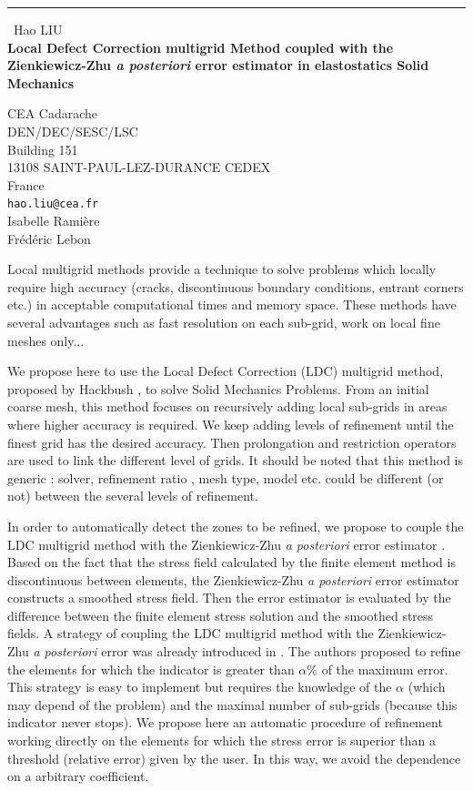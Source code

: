 \documentclass{report}
\begin{document}
\begin{center}
\rule{6in}{1pt} \
{\large Hao LIU \\
{\bf Local Defect Correction multigrid Method coupled with the Zienkiewicz-Zhu \emph{a posteriori} error estimator in elastostatics Solid Mechanics}}

CEA Cadarache \\ DEN/DEC/SESC/LSC \\ Building 151 \\ 13108 SAINT-PAUL-LEZ-DURANCE CEDEX \\ France
\\
{\tt hao.liu@cea.fr}\\
Isabelle Rami{\`e}re\\
Fr{\'e}d{\'e}ric Lebon\end{center}

Local multigrid methods provide a technique to solve problems which
locally require high accuracy (cracks, discontinuous boundary conditions,
entrant corners etc.) in acceptable computational times and memory space.
These methods have several advantages such as fast resolution on each
sub-grid, work on local fine meshes only...

We propose here to use the Local Defect Correction (LDC) multigrid
method, proposed by Hackbush \cite{Hackbusch84}, to solve Solid Mechanics
Problems. From an initial coarse mesh, this method focuses on recursively
adding local sub-grids in areas where higher accuracy is required. We
keep adding levels of refinement until the finest grid has the desired
accuracy. Then prolongation and restriction operators are used to link
the different level of grids. It should be noted that this method is
generic : solver, refinement ratio , mesh type, model etc. could be
different (or not) between the several levels of refinement.

In order to automatically detect the zones to be refined, we propose to
couple the LDC multigrid method with the Zienkiewicz-Zhu \emph{a
posteriori} error estimator \cite{Zienkiewicz87}. Based on the fact that
the stress field calculated by the finite element method is discontinuous
between elements, the Zienkiewicz-Zhu \emph{a posteriori} error estimator
constructs a smoothed stress field. Then the error estimator is evaluated
by the difference between the finite element stress solution and the
smoothed stress fields. A strategy of coupling the LDC multigrid method
with the Zienkiewicz-Zhu \emph{a posteriori} error was already introduced
in \cite{Barbie13CAS,Barbie11}. The authors proposed to refine the
elements for which the indicator is greater than $\alpha$\% of the
maximum error. This strategy is easy to implement but requires the
knowledge of the $\alpha$ (which may depend of the problem) and the
maximal number of sub-grids (because this indicator never stops). We
propose here an automatic procedure of refinement working directly on the
elements for which the stress error is superior than a threshold
(relative error) given by the user. In this way, we avoid the dependence
on a arbitrary coefficient.
\end{document}
